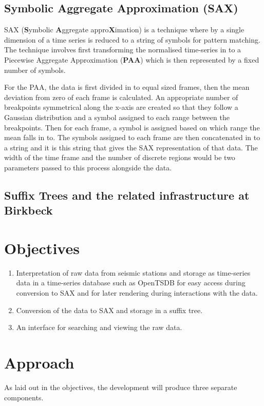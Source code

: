 \documentclass[11pt]{scrartcl}
\begin{document}
\subsection{Symbolic Aggregate Approximation (SAX)}
	SAX (\textbf{S}ymbolic \textbf{A}ggregate appro\textbf{X}imation) \citep{sax} is a technique where by a single dimension of a time series is reduced to a string of symbols for pattern matching.  The technique involves first transforming the normalised time-series in to a Piecewise Aggregate Approximation (\textbf{PAA}) which is then represented by a fixed number of symbols.
	
	For the PAA, the data is first divided in to equal sized frames, then the mean deviation from zero of each frame is calculated.  An appropriate number of breakpoints symmetrical along the x-axis are created so that they follow a Gaussian distribution and a symbol assigned to each range between the breakpoints.  Then for each frame, a symbol is assigned based on which range the mean falls in to.  The symbols assigned to each frame are then concatenated in to a string and it is this string that gives the SAX representation of that data.  The width of the time frame and the number of discrete regions would be two parameters passed to this process alongside the data.
	
\subsection{Suffix Trees and the related infrastructure at Birkbeck}

\section{Objectives}
\begin{enumerate}
	\item Interpretation of raw data from seismic stations and storage as time-series data in a time-series database such as OpenTSDB for easy access during conversion to SAX and for later rendering during interactions with the data.
	\item Conversion of the data to SAX and storage in a suffix tree.
	\item An interface for searching and viewing the raw data.
\end{enumerate}

\section{Approach}
	As laid out in the objectives, the development will produce three separate components.
	
\end{document}
